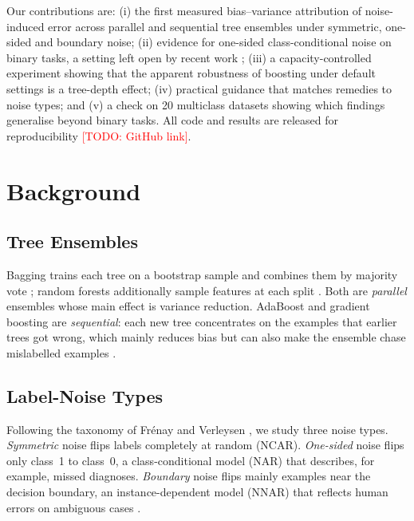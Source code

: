 \documentclass[conference,a4paper]{IEEEtran}
\newcommand{\todo}[1]{\textcolor{red}{[TODO: #1]}}
\begin{document}
Our contributions are: (i) the first measured bias--variance attribution of noise-induced error across parallel and sequential tree ensembles under symmetric, one-sided and boundary noise; (ii) evidence for one-sided class-conditional noise on binary tasks, a setting left open by recent work \cite{morampudi2026}; (iii) a capacity-controlled experiment showing that the apparent robustness of boosting under default settings is a tree-depth effect; (iv) practical guidance that matches remedies to noise types; and (v) a check on 20 multiclass datasets showing which findings generalise beyond binary tasks. All code and results are released for reproducibility \todo{GitHub link}.

\section{Background}

\subsection{Tree Ensembles}
Bagging trains each tree on a bootstrap sample and combines them by majority vote \cite{breiman1996}; random forests additionally sample features at each split \cite{breiman2001}. Both are \emph{parallel} ensembles whose main effect is variance reduction. AdaBoost \cite{freund1997} and gradient boosting \cite{friedman2001,chen2016} are \emph{sequential}: each new tree concentrates on the examples that earlier trees got wrong, which mainly reduces bias but can also make the ensemble chase mislabelled examples \cite{long2010}.

\subsection{Label-Noise Types}
Following the taxonomy of Fr\'enay and Verleysen \cite{frenay2014}, we study three noise types. \emph{Symmetric} noise flips labels completely at random (NCAR). \emph{One-sided} noise flips only class~1 to class~0, a class-conditional model (NAR) \cite{natarajan2013} that describes, for example, missed diagnoses. \emph{Boundary} noise flips mainly examples near the decision boundary, an instance-dependent model (NNAR) that reflects human errors on ambiguous cases \cite{saez2022}.
\end{document}
